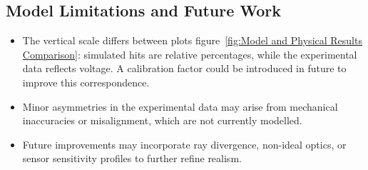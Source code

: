 \subsection{Model Limitations and Future Work}
\begin{itemize}
    \item The vertical scale differs between plots figure~\ref{fig:Model and Physical Results Comparison}: simulated hits are relative percentages, while the experimental data reflects voltage. A calibration factor could be introduced in future to improve this correspondence.
    \item Minor asymmetries in the experimental data may arise from mechanical inaccuracies or misalignment, which are not currently modelled.
    \item Future improvements may incorporate ray divergence, non-ideal optics, or sensor sensitivity profiles to further refine realism.
\end{itemize}





%




%         
